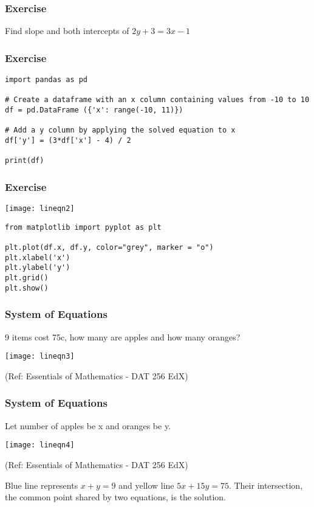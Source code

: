  \begin{frame}[fragile]\frametitle{Exercise}
Find slope and both intercepts of $2y + 3 = 3x -1 $
\end{frame}

 \begin{frame}[fragile]\frametitle{Exercise}
\begin{lstlisting}
import pandas as pd

# Create a dataframe with an x column containing values from -10 to 10
df = pd.DataFrame ({'x': range(-10, 11)})

# Add a y column by applying the solved equation to x
df['y'] = (3*df['x'] - 4) / 2

print(df)
\end{lstlisting}
\end{frame}

 \begin{frame}[fragile]\frametitle{Exercise}
 
\begin{center}
\texttt{[image: lineqn2]}
\end{center}

\begin{lstlisting}
from matplotlib import pyplot as plt

plt.plot(df.x, df.y, color="grey", marker = "o")
plt.xlabel('x')
plt.ylabel('y')
plt.grid()
plt.show()
\end{lstlisting}

\end{frame}


 \begin{frame}[fragile]\frametitle{System of Equations}
 9 items cost 75c, how many are apples and how many oranges?
\begin{center}
\texttt{[image: lineqn3]}

{\tiny (Ref: Essentials of Mathematics - DAT 256 EdX)}
\end{center}
\end{frame}

 \begin{frame}[fragile]\frametitle{System of Equations}
Let number of apples be x and oranges be y.
\begin{center}
\texttt{[image: lineqn4]}

{\tiny (Ref: Essentials of Mathematics - DAT 256 EdX)}
\end{center}
Blue line represents $x+y=9$ and yellow line $5x+15y=75$. Their intersection, the common point shared by two equations, is the solution.
\end{frame}

